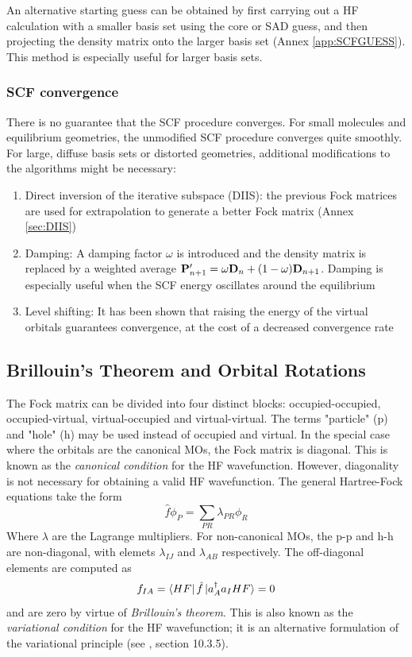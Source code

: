 An alternative starting guess can be obtained by first carrying out a HF calculation with a smaller basis set using the core or SAD guess, and then projecting the density matrix onto the larger basis set (Annex \ref{app:SCFGUESS}). This method is especially useful for larger basis sets.  

\subsubsection{SCF convergence}

There is no guarantee that the SCF procedure converges. For small molecules and equilibrium geometries, the unmodified SCF procedure converges quite smoothly. For large, diffuse basis sets or distorted geometries, additional modifications to the algorithms might be necessary:
\begin{enumerate}
\item Direct inversion of the iterative subspace (DIIS): the previous Fock matrices are used for extrapolation to generate a better Fock matrix (Annex \ref{sec:DIIS})
\item Damping: A damping factor $\omega$ is introduced and the density matrix is replaced by a weighted average $\mathbf{P}'_{n+1} = \omega \mathbf{D}_n + (1-\omega)\mathbf{D}_{n+1}$. Damping is especially useful when the SCF energy oscillates around the equilibrium
\item Level shifting: It has been shown that raising the energy of the virtual orbitals guarantees convergence, at the cost of a decreased convergence rate
\end{enumerate} 

\subsection{Brillouin's Theorem and Orbital Rotations}

The Fock matrix can be divided into four distinct blocks: occupied-occupied, occupied-virtual, virtual-occupied and virtual-virtual. The terms "particle" (p) and "hole" (h) may be used instead of occupied and virtual. In the special case where the orbitals are the canonical MOs, the Fock matrix is diagonal. This is known as the \emph{canonical condition} for the HF wavefunction. However, diagonality is not necessary for obtaining a valid HF wavefunction. The general Hartree-Fock equations take the form
\begin{equation}
\hat{f} \phi_P = \sum_{PR} \lambda_{PR} \phi_R
\end{equation}
\noindent Where $\lambda$ are the Lagrange multipliers. For non-canonical MOs, the p-p and h-h are non-diagonal, with elemets $\lambda_{IJ}$ and $\lambda_{AB}$ respectively. The off-diagonal elements are computed as
\begin{equation}
f_{IA} = \bra{\smash{HF}}\hat{f}\ket{\smash{a^{\dagger}_A a_I HF}} = 0
\end{equation}
\noindent and are zero by virtue of \emph{Brillouin's theorem}. This is also known as the \emph{variational condition} for the HF wavefunction; it is an alternative formulation of the variational principle (see \cite{Hel2000}, section 10.3.5).

